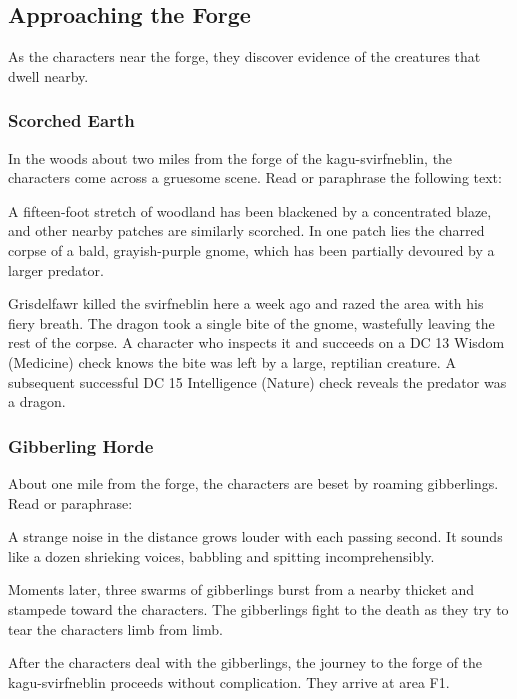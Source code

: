 \documentclass[10pt,a4paper,twoside,bg=print,twocolumn,openany,nodeprecatedcode]{dndbook}
\begin{document}
\subsection{Approaching the Forge}
As the characters near the forge, they discover evidence of the creatures that dwell nearby.

\subsubsection{Scorched Earth}
In the woods about two miles from the forge of the kagu-svirfneblin, the characters come across a gruesome scene. Read or paraphrase the following text:

\begin{DndReadAloud}{}
A fifteen-foot stretch of woodland has been blackened by a concentrated blaze, and other nearby patches are similarly scorched. In one patch lies the charred corpse of a bald, grayish-purple gnome, which has been partially devoured by a larger predator.

\end{DndReadAloud}

Grisdelfawr killed the svirfneblin here a week ago and razed the area with his fiery breath. The dragon took a single bite of the gnome, wastefully leaving the rest of the corpse. A character who inspects it and succeeds on a DC 13 Wisdom (Medicine) check knows the bite was left by a large, reptilian creature. A subsequent successful DC 15 Intelligence (Nature) check reveals the predator was a dragon.

\subsubsection{Gibberling Horde}
About one mile from the forge, the characters are beset by roaming gibberlings. Read or paraphrase:

\begin{DndReadAloud}{}
A strange noise in the distance grows louder with each passing second. It sounds like a dozen shrieking voices, babbling and spitting incomprehensibly.

\end{DndReadAloud}

Moments later, three swarms of gibberlings burst from a nearby thicket and stampede toward the characters. The gibberlings fight to the death as they try to tear the characters limb from limb.

After the characters deal with the gibberlings, the journey to the forge of the kagu-svirfneblin proceeds without complication. They arrive at area F1.
\end{document}
